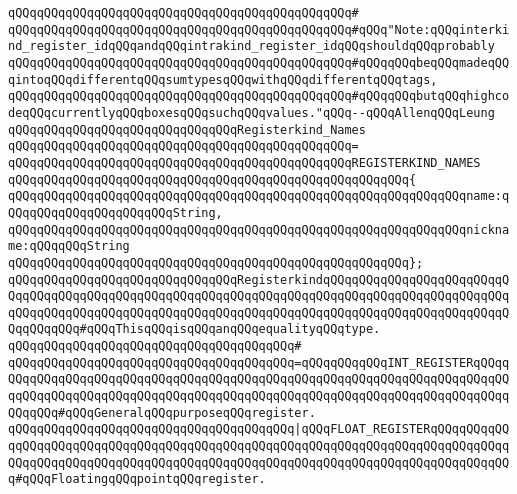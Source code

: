\verb|qQQqqQQqqQQqqQQqqQQqqQQqqQQqqQQqqQQqqQQqqQQqqQQq#|\newline
\verb|qQQqqQQqqQQqqQQqqQQqqQQqqQQqqQQqqQQqqQQqqQQqqQQq#qQQq"Note:qQQqinterkind_register_idqQQqandqQQqintrakind_register_idqQQqshouldqQQqprobably|\newline
\verb|qQQqqQQqqQQqqQQqqQQqqQQqqQQqqQQqqQQqqQQqqQQqqQQq#qQQqqQQqbeqQQqmadeqQQqintoqQQqdifferentqQQqsumtypesqQQqwithqQQqdifferentqQQqtags,|\newline
\verb|qQQqqQQqqQQqqQQqqQQqqQQqqQQqqQQqqQQqqQQqqQQqqQQq#qQQqqQQqbutqQQqhighcodeqQQqcurrentlyqQQqboxesqQQqsuchqQQqvalues."qQQq--qQQqAllenqQQqLeung|\newline
\newline
\newline
\verb|qQQqqQQqqQQqqQQqqQQqqQQqqQQqqQQqRegisterkind_Names|\newline
\verb|qQQqqQQqqQQqqQQqqQQqqQQqqQQqqQQqqQQqqQQqqQQqqQQq=|\newline
\verb|qQQqqQQqqQQqqQQqqQQqqQQqqQQqqQQqqQQqqQQqqQQqqQQqREGISTERKIND_NAMES|\newline
\verb|qQQqqQQqqQQqqQQqqQQqqQQqqQQqqQQqqQQqqQQqqQQqqQQqqQQqqQQq{|\newline
\verb|qQQqqQQqqQQqqQQqqQQqqQQqqQQqqQQqqQQqqQQqqQQqqQQqqQQqqQQqqQQqqQQqname:qQQqqQQqqQQqqQQqqQQqqQQqString,|\newline
\verb|qQQqqQQqqQQqqQQqqQQqqQQqqQQqqQQqqQQqqQQqqQQqqQQqqQQqqQQqqQQqqQQqnickname:qQQqqQQqString|\newline
\verb|qQQqqQQqqQQqqQQqqQQqqQQqqQQqqQQqqQQqqQQqqQQqqQQqqQQqqQQq};|\newline
\newline
\verb|qQQqqQQqqQQqqQQqqQQqqQQqqQQqqQQqRegisterkindqQQqqQQqqQQqqQQqqQQqqQQqqQQqqQQqqQQqqQQqqQQqqQQqqQQqqQQqqQQqqQQqqQQqqQQqqQQqqQQqqQQqqQQqqQQqqQQqqQQqqQQqqQQqqQQqqQQqqQQqqQQqqQQqqQQqqQQqqQQqqQQqqQQqqQQqqQQqqQQqqQQqqQQqqQQqqQQq#qQQqThisqQQqisqQQqanqQQqequalityqQQqtype.|\newline
\verb|qQQqqQQqqQQqqQQqqQQqqQQqqQQqqQQqqQQqqQQq#|\newline
\verb|qQQqqQQqqQQqqQQqqQQqqQQqqQQqqQQqqQQqqQQq=qQQqqQQqqQQqINT_REGISTERqQQqqQQqqQQqqQQqqQQqqQQqqQQqqQQqqQQqqQQqqQQqqQQqqQQqqQQqqQQqqQQqqQQqqQQqqQQqqQQqqQQqqQQqqQQqqQQqqQQqqQQqqQQqqQQqqQQqqQQqqQQqqQQqqQQqqQQqqQQqqQQqqQQqqQQq#qQQqGeneralqQQqpurposeqQQqregister.|\newline
\verb|qQQqqQQqqQQqqQQqqQQqqQQqqQQqqQQqqQQqqQQq|\verb#|qQQqFLOAT_REGISTERqQQqqQQqqQQqqQQqqQQqqQQqqQQqqQQqqQQqqQQqqQQqqQQqqQQqqQQqqQQqqQQqqQQqqQQqqQQqqQQqqQQqqQQqqQQqqQQqqQQqqQQqqQQqqQQqqQQqqQQqqQQqqQQqqQQqqQQqqQQqqQQqqQQqqQQq#\verb|#qQQqFloatingqQQqpointqQQqregister.|\newline
